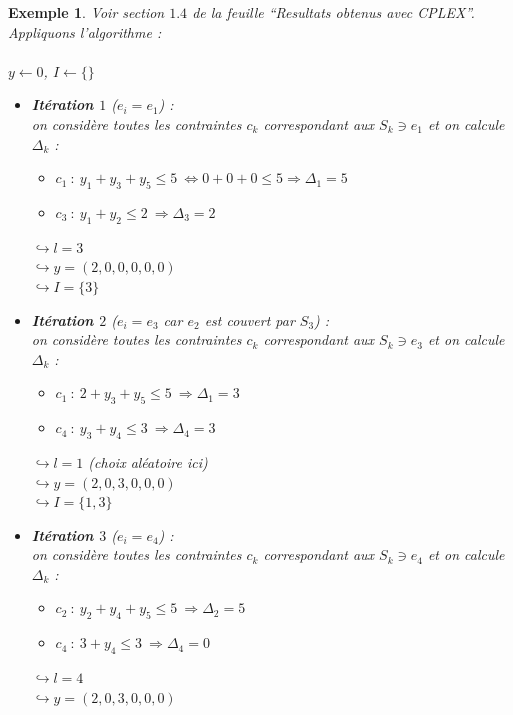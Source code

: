 \documentclass{article}
\newtheorem{exemple}{Exemple}[section]
\begin{document}
\begin{sffamily}
\begin{exemple}
Voir section $1.4$ de la feuille ``Resultats obtenus avec CPLEX''. Appliquons l'algorithme : \\
$ $\\
\indent $y \leftarrow 0$, $I \leftarrow \{\}$
\begin{itemize}
\item \textbf{Itération $1$} ($e_i = e_1$) :\\
on considère toutes les contraintes $c_k$ correspondant aux $S_k \ni e_1$ et on calcule $\Delta_k$ :
	\begin{itemize}
	\item $c_1\ :\ y_1+y_3+y_5 \leq 5\ \Leftrightarrow 0+0+0\leq 5 \Rightarrow \Delta_1 = 5$
	\item $c_3\ :\ y_1+y_2 \leq 2\ \Rightarrow \Delta_3 = 2$
	\end{itemize}
	$\hookrightarrow l = 3$ \\
	$\hookrightarrow y = (2,0,0,0,0,0)$\\
	$\hookrightarrow I = \{3\}$\\
\item \textbf{Itération $2$} ($e_i = e_3$ car $e_2$ est couvert par $S_3$) :\\
on considère toutes les contraintes $c_k$ correspondant aux $S_k \ni e_3$ et on calcule $\Delta_k$ :
	\begin{itemize}
	\item $c_1\ :\ 2+y_3+y_5 \leq 5\ \Rightarrow \Delta_1 = 3$
	\item $c_4\ :\ y_3+y_4 \leq 3\ \Rightarrow \Delta_4 = 3$
	\end{itemize}
	$\hookrightarrow l = 1$ (choix aléatoire ici)\\
	$\hookrightarrow y = (2,0,3,0,0,0)$\\
	$\hookrightarrow I = \{1,3\}$\\
\item \textbf{Itération $3$} ($e_i = e_4$) :\\
on considère toutes les contraintes $c_k$ correspondant aux $S_k \ni e_4$ et on calcule $\Delta_k$ :
	\begin{itemize}
	\item $c_2\ :\ y_2+y_4+y_5 \leq 5\ \Rightarrow \Delta_2 = 5$
	\item $c_4\ :\ 3+y_4 \leq 3\ \Rightarrow \Delta_4 = 0$
	\end{itemize}
	$\hookrightarrow l = 4$\\
	$\hookrightarrow y = (2,0,3,0,0,0)$\\

\end{itemize}
\end{exemple}
\end{sffamily}
\end{document}
